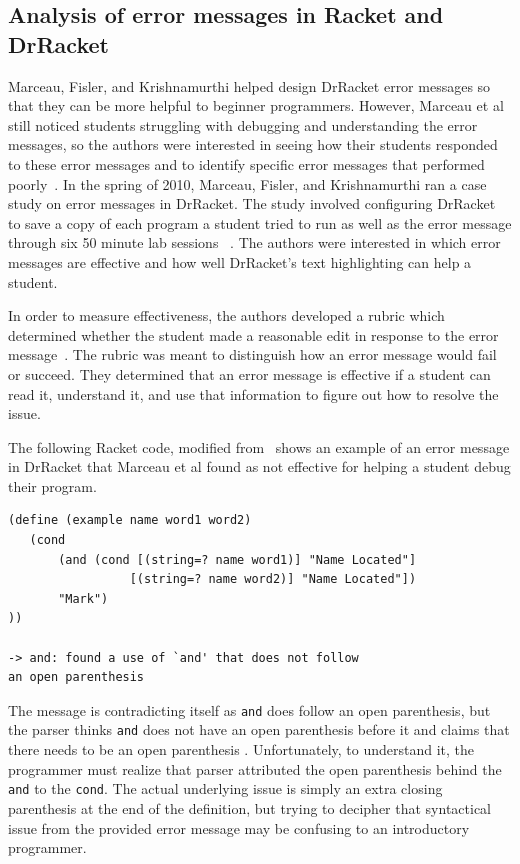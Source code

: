 \documentclass{sig-alternate}
\begin{document}
\subsection{Analysis of error messages in Racket and DrRacket}\label{subsec:racket analysis}
Marceau, Fisler, and Krishnamurthi helped design DrRacket error messages so that they can be more helpful to beginner programmers.
However, Marceau et al still noticed students struggling with debugging and understanding the error messages, so the authors were interested in seeing how their students responded to these error messages and to identify specific error messages that performed poorly~\cite{Marceau:2011:MYL:2048237.2048241}.
In the spring of 2010, Marceau, Fisler, and Krishnamurthi ran a case study on error messages in DrRacket.
The study involved configuring DrRacket to save a copy of each program a student tried to run as well as the error message through six 50 minute lab sessions ~\cite{Marceau:2011:MEE:1953163.1953308}.
The authors were interested in which error messages are effective and how well DrRacket's text highlighting can help a student.  

In order to measure effectiveness, the authors developed a rubric which determined whether the student made a reasonable edit in response to the error message~\cite{Marceau:2011:MEE:1953163.1953308}.
The rubric was meant to distinguish how an error message would fail or succeed.
They determined that an error message is effective if a student can read it, understand it, and use that information to figure out how to resolve the issue.

The following Racket code, modified from~\cite{Marceau:2011:MEE:1953163.1953308}  shows an example of an error message in DrRacket that Marceau et al found as not effective for helping a student debug their program.

\begin{verbatim}
(define (example name word1 word2)
   (cond
  	   (and (cond [(string=? name word1)] "Name Located"]
                 [(string=? name word2)] "Name Located"])
       "Mark")
))

-> and: found a use of `and' that does not follow 
an open parenthesis
\end{verbatim}

The message is contradicting itself as \texttt{and} does follow an open parenthesis, but the parser thinks \texttt{and} does not have an open parenthesis before it and claims that there needs to be an open parenthesis .
Unfortunately, to understand it, the programmer must realize that parser attributed the open parenthesis behind the \texttt{and} to the \texttt{cond}.
The actual underlying issue is simply an extra closing parenthesis at the end of the definition, but trying to decipher that syntactical issue from the provided error message may be confusing to an introductory programmer.
\end{document}
